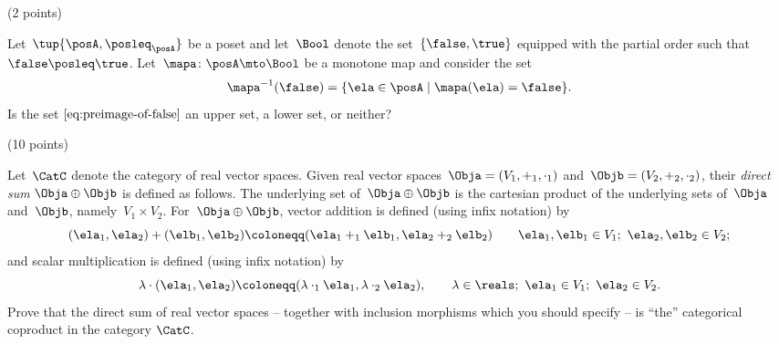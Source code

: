 \documentclass[paper=8.125in:10.250in,pagesize=pdftex,
    headinclude=false,footinclude=false,oneside,egregdoesnotlikesansseriftitles]{kaobook}
\begin{document}

\newpage

\begin{gradedexercise}\label{ex:UpperLowerPreimage}
(2 points) 

Let~$\tup{\posA, \posleq_\posA}$ be a poset and let~$\Bool$ denote the set~$\{ \false, \true \}$ equipped with the partial order such that~$\false \posleq \true$.
Let~$\mapa \colon \posA \mto \Bool$ be a monotone map and consider the set
\begin{equation}
    \label{eq:preimage-of-false}
\mapa^{-1}(\false) = \{ \ela \in \posA \mid \mapa(\ela) = \false \}.
\end{equation}
Is the set $\cref{eq:preimage-of-false}$ an upper set, a lower set, or neither? 
\end{gradedexercise}


\newpage


\begin{gradedexercise}\label{ex:DirectSumCopr} (10 points) 


Let~$\CatC$ denote the category of real vector spaces.
Given real vector spaces~$\Obja = (V_1, +_1, \cdot_1)$ and~$\Objb = (V_2, +_2, \cdot_2)$, their \emph{direct sum} $\Obja \oplus \Objb$ is defined as follows.
The underlying set of~$\Obja \oplus \Objb$ is the cartesian product of the underlying sets of~$\Obja$ and~$\Objb$, namely~$V_1 \times V_2$.
For~$\Obja \oplus \Objb$, vector addition is defined (using infix notation) by
\begin{equation*}
(\ela_1, \ela_2) + (\elb_1, \elb_2) \coloneqq (\ela_1 +_1 \elb_1, \ela_2 +_2 \elb_2) \quad \quad \ela_1, \elb_1 \in V_1; \ \ela_2, \elb_2 \in V_2;
\end{equation*}
and scalar multiplication is defined (using infix notation) by
\begin{equation*}
\lambda \cdot (\ela_1, \ela_2) \coloneqq (\lambda \cdot_1 \ela_1, \lambda \cdot_2 \ela_2), \quad \quad \lambda \in \reals; \ \ela_1 \in V_1; \ \ela_2 \in V_2.
\end{equation*}
Prove that the direct sum of real vector spaces -- together with inclusion morphisms which you should specify -- is ``the'' categorical coproduct in the category $\CatC$. 
\end{gradedexercise}


\newpage
\end{document}
